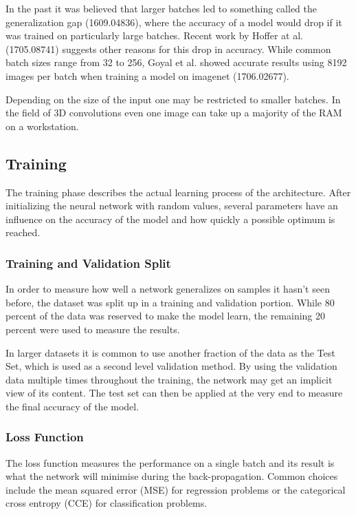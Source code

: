 In the past it was believed that larger batches led to something called the generalization gap (1609.04836), where the accuracy of a model would drop if it was trained on particularly large batches. Recent work by Hoffer at al. (1705.08741) suggests other reasons for this drop in accuracy. While common batch sizes range from 32 to 256, Goyal et al. showed accurate results using 8192 images per batch when training a model on imagenet (1706.02677).

Depending on the size of the input one may be restricted to smaller batches. In the field of 3D convolutions even one image can take up a majority of the RAM on a workstation.

\subsection{Training}

The training phase describes the actual learning process of the architecture. After initializing the neural network with random values, several parameters have an influence on the accuracy of the model and how quickly a possible optimum is reached.

\subsubsection{Training and Validation Split}

In order to measure how well a network generalizes on samples it hasn't seen before, the dataset was split up in a training and validation portion. While 80 percent of the data was reserved to make the model learn, the remaining 20 percent were used to measure the results.

In larger datasets it is common to use another fraction of the data as the Test Set, which is used as a second level validation method. By using the validation data multiple times throughout the training, the network may get an implicit view of its content. The test set can then be applied at the very end to measure the final accuracy of the model.

\subsubsection{Loss Function}

The loss function measures the performance on a single batch and its result is what the network will minimise during the back-propagation. Common choices include the mean squared error (MSE) for regression problems or the categorical cross entropy (CCE) for classification problems. 

